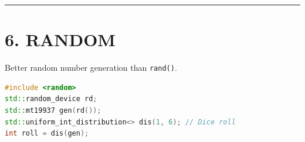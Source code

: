 \begin{center}\rule{0.5\linewidth}{0.5pt}\end{center}

\hypertarget{random}{%
\section{6. RANDOM}\label{random}}

Better random number generation than \passthrough{\lstinline!rand()!}.

\begin{lstlisting}[language={C++}]
#include <random>
std::random_device rd;
std::mt19937 gen(rd());
std::uniform_int_distribution<> dis(1, 6); // Dice roll
int roll = dis(gen);
\end{lstlisting}
